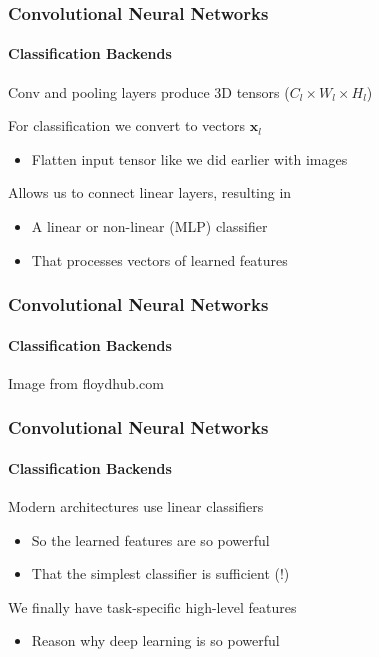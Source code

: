 \documentclass[xetex,professionalfont]{beamer}
\renewcommand\emph[1]{\textcolor{tuwcvl_cvl_blue}{#1}}
\renewcommand{\vec}[1]{\ensuremath{\mathbf{#1}}}
\newcommand{\vx}{\vec{x}}
\begin{document}
\begin{frame}
\frametitle{Convolutional Neural Networks}
\framesubtitle{Classification Backends}

Conv and pooling layers produce 3D tensors ($C_l\times W_l\times H_l$)

\bigskip

For classification we convert to vectors $\vx_l$
\begin{itemize}
    \item Flatten input tensor like we did earlier with images
\end{itemize}

\bigskip

Allows us to connect linear layers, resulting in
\begin{itemize}
    \item A linear or non-linear (MLP) classifier %
    \item That processes vectors of \emph{learned features} %
\end{itemize}

\end{frame}


\begin{frame}
\frametitle{Convolutional Neural Networks}
\framesubtitle{Classification Backends}

\begin{center}
    {\centering Image from floydhub.com}
\end{center}

\end{frame}


\begin{frame}
\frametitle{Convolutional Neural Networks}
\framesubtitle{Classification Backends}

Modern architectures use linear classifiers
\begin{itemize}
    \item So the learned features are so powerful
    \item That the simplest classifier is sufficient (!)
\end{itemize}

\bigskip

We finally have task-specific high-level features %
\begin{itemize}
    \item Reason why deep learning is so powerful
\end{itemize}

\end{frame}
\end{document}
